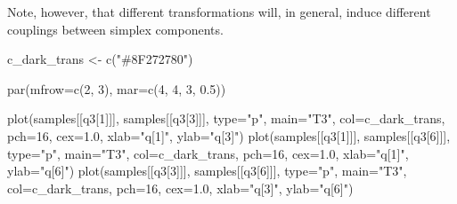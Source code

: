 \documentclass[
  letterpaper,
  DIV=11,
  numbers=noendperiod]{scrartcl}
\newenvironment{Shaded}{\begin{snugshade}}{\end{snugshade}}
\newcommand{\AttributeTok}[1]{\textcolor[rgb]{0.40,0.45,0.13}{#1}}
\newcommand{\DecValTok}[1]{\textcolor[rgb]{0.68,0.00,0.00}{#1}}
\newcommand{\FloatTok}[1]{\textcolor[rgb]{0.68,0.00,0.00}{#1}}
\newcommand{\FunctionTok}[1]{\textcolor[rgb]{0.28,0.35,0.67}{#1}}
\newcommand{\NormalTok}[1]{\textcolor[rgb]{0.00,0.23,0.31}{#1}}
\newcommand{\OtherTok}[1]{\textcolor[rgb]{0.00,0.23,0.31}{#1}}
\newcommand{\StringTok}[1]{\textcolor[rgb]{0.13,0.47,0.30}{#1}}
\begin{document}
Note, however, that different transformations will, in general, induce
different couplings between simplex components.

\begin{Shaded}
\begin{Highlighting}[]
\NormalTok{c\_dark\_trans }\OtherTok{\textless{}{-}} \FunctionTok{c}\NormalTok{(}\StringTok{"\#8F272780"}\NormalTok{)}

\FunctionTok{par}\NormalTok{(}\AttributeTok{mfrow=}\FunctionTok{c}\NormalTok{(}\DecValTok{2}\NormalTok{, }\DecValTok{3}\NormalTok{), }\AttributeTok{mar=}\FunctionTok{c}\NormalTok{(}\DecValTok{4}\NormalTok{, }\DecValTok{4}\NormalTok{, }\DecValTok{3}\NormalTok{, }\FloatTok{0.5}\NormalTok{))}

\FunctionTok{plot}\NormalTok{(samples[[}\StringTok{\textquotesingle{}q3[1]\textquotesingle{}}\NormalTok{]], samples[[}\StringTok{\textquotesingle{}q3[3]\textquotesingle{}}\NormalTok{]], }\AttributeTok{type=}\StringTok{"p"}\NormalTok{,}
     \AttributeTok{main=}\StringTok{"T3"}\NormalTok{, }\AttributeTok{col=}\NormalTok{c\_dark\_trans, }\AttributeTok{pch=}\DecValTok{16}\NormalTok{, }\AttributeTok{cex=}\FloatTok{1.0}\NormalTok{,}
     \AttributeTok{xlab=}\StringTok{"q[1]"}\NormalTok{, }\AttributeTok{ylab=}\StringTok{"q[3]"}\NormalTok{)}
\FunctionTok{plot}\NormalTok{(samples[[}\StringTok{\textquotesingle{}q3[1]\textquotesingle{}}\NormalTok{]], samples[[}\StringTok{\textquotesingle{}q3[6]\textquotesingle{}}\NormalTok{]], }\AttributeTok{type=}\StringTok{"p"}\NormalTok{,}
     \AttributeTok{main=}\StringTok{"T3"}\NormalTok{, }\AttributeTok{col=}\NormalTok{c\_dark\_trans, }\AttributeTok{pch=}\DecValTok{16}\NormalTok{, }\AttributeTok{cex=}\FloatTok{1.0}\NormalTok{,}
     \AttributeTok{xlab=}\StringTok{"q[1]"}\NormalTok{, }\AttributeTok{ylab=}\StringTok{"q[6]"}\NormalTok{)}
\FunctionTok{plot}\NormalTok{(samples[[}\StringTok{\textquotesingle{}q3[3]\textquotesingle{}}\NormalTok{]], samples[[}\StringTok{\textquotesingle{}q3[6]\textquotesingle{}}\NormalTok{]], }\AttributeTok{type=}\StringTok{"p"}\NormalTok{,}
     \AttributeTok{main=}\StringTok{"T3"}\NormalTok{, }\AttributeTok{col=}\NormalTok{c\_dark\_trans, }\AttributeTok{pch=}\DecValTok{16}\NormalTok{, }\AttributeTok{cex=}\FloatTok{1.0}\NormalTok{,}
     \AttributeTok{xlab=}\StringTok{"q[3]"}\NormalTok{, }\AttributeTok{ylab=}\StringTok{"q[6]"}\NormalTok{)}


\end{Highlighting}
\end{Shaded}
\end{document}
